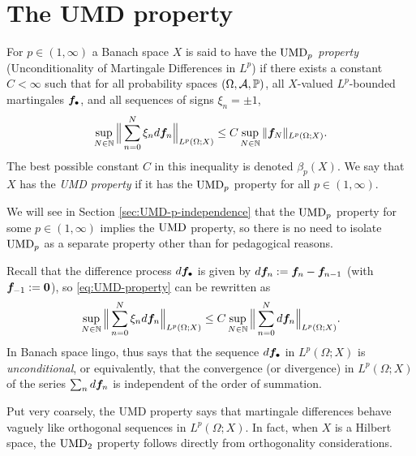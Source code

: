 
\section{The UMD property}

\begin{defn}
  For $p \in (1,\infty)$ a Banach space $X$ is said to have the \emph{$\mathrm{UMD}_{p}$ property} (Unconditionality of Martingale Differences in $L^p$) if there exists a constant $C < \infty$ such that for all probability spaces $(\Omega,\mathcal{A},\mathbb{P})$, all $X$-valued $L^p$-bounded martingales $\bm{f}_{\bullet}$, and all sequences of signs $\xi_n = \pm 1$,
  \begin{equation}\label{eq:UMD-property}
    \sup_{N \in \mathbb{N}} \Big\| \sum_{n=0}^{N} \xi_{n} d\bm{f}_{n} \Big\|_{L^p(\Omega;X)} \leq C \sup_{N \in \mathbb{N}} \|\bm{f}_N\|_{L^p(\Omega;X)}.
  \end{equation}
  The best possible constant $C$ in this inequality is denoted $\beta_{p}(X)$.
  We say that $X$ has the \emph{UMD property} if it has the $\mathrm{UMD}_{p}$ property for all $p \in (1,\infty)$.
\end{defn}

\begin{rmk}
  We will see in Section \ref{sec:UMD-p-independence} that the $\mathrm{UMD}_{p}$ property for some $p \in (1,\infty)$ implies the $\mathrm{UMD}$ property, so there is no need to isolate $\mathrm{UMD}_{p}$ as a separate property other than for pedagogical reasons.
\end{rmk}

Recall that the difference process $d\bm{f}_{\bullet}$ is given by $d\bm{f}_{n} := \bm{f}_n - \bm{f}_{n-1}$ (with $\bm{f}_{-1} := \bm{0}$), so \eqref{eq:UMD-property} can be rewritten as
\begin{equation*}
  \sup_{N \in \mathbb{N}} \Big\| \sum_{n=0}^{N} \xi_{n} d\bm{f}_{n} \Big\|_{L^p(\Omega;X)} \leq C \sup_{N \in \mathbb{N}} \Big\| \sum_{n=0}^{N} d\bm{f}_{n}\Big\|_{L^p(\Omega;X)}.
\end{equation*}
In Banach space lingo, thus says that the sequence $d\bm{f}_\bullet$ in $L^p(\Omega;X)$ is \emph{unconditional}, or equivalently, that the convergence (or divergence) in $L^p(\Omega;X)$ of the series $\sum_{n} d\bm{f}_n$ is independent of the order of summation.

Put very coarsely, the UMD property says that martingale differences behave vaguely like orthogonal sequences in $L^p(\Omega;X)$.
In fact, when $X$ is a Hilbert space, the $\mathrm{UMD}_{2}$ property follows directly from orthogonality considerations.

